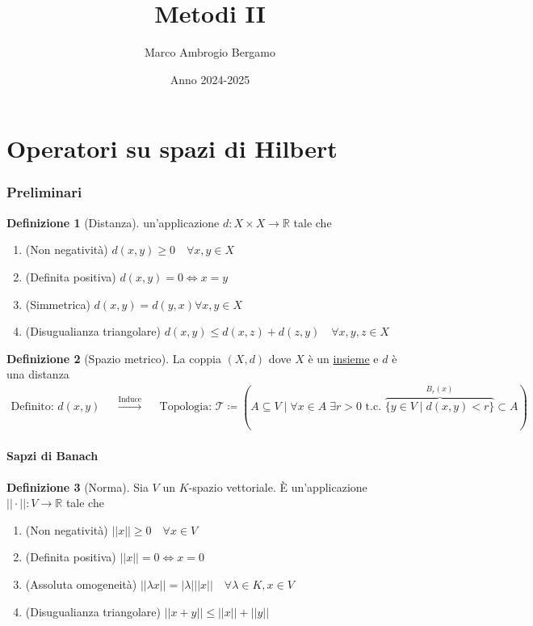 \documentclass[a4paper,10pt]{article}
\title{\textbf{Metodi II}}
\author{Marco Ambrogio Bergamo}
\date{Anno 2024-2025}
\theoremstyle{definition}
\newcommand{\re}{\mathbb{R}} %
\theoremstyle{indentdefinition}
\newtheorem{defn}{Definizione}[section]
\theoremstyle{indenttheorem}
\theoremstyle{myremark}
\theoremstyle{indentgeneral}
\begin{document}
\maketitle
\tableofcontents{}

\pagebreak
\part{Operatori su spazi di Hilbert}
\section{Preliminari}
\begin{defn}[Distanza]
    un'applicazione $d: X\times X \to \re$ tale che
    \begin{enumerate}
        \item (Non negatività) $d(x,y)\ge 0 \quad \forall x,y\in X$
        \item (Definita positiva) $d(x,y)=0 \iff x=y$
        \item (Simmetrica) $d(x,y)=d(y,x) \forall x,y\in X $
        \item (Disugualianza triangolare) $d(x,y)\le d(x,z)+d(z,y) \quad \forall x,y,z\in X$
    \end{enumerate}
\end{defn}
\begin{defn}[Spazio metrico]
    La coppia $(X, d)$ dove $X$ è un \underline{insieme} e $d$ è una distanza 
    \begin{align*}
        \text{Definito: } d(x,y) & & \overset{\text{Induce}}{\longrightarrow} & &\text{Topologia: } \mathcal{T} \coloneqq (A\subseteq V \mid \forall x\in A \; \exists r>0 \text{ t.c. } \overbrace{\{y\in V\mid d(x,y)<r\}}^{B_r(x)}\subset A)
\end{align*}
\end{defn}

\subsection{Sapzi di Banach}
\begin{defn}[Norma]Sia $V$ un $K$-spazio vettoriale. È un'applicazione $||\cdot||: V \to \re$ tale che
    \begin{enumerate}
        \item (Non negatività) $||x||\ge 0 \quad \forall x\in V$
        \item (Definita positiva) $||x||=0 \iff x=0$
        \item (Assoluta omogeneità) $||\lambda x||=|\lambda| ||x|| \quad \forall \lambda \in K, x\in V$
        \item (Disugualianza triangolare) $||x+y||\le ||x||+||y||$
    \end{enumerate}
    
\end{defn}
\end{document}
